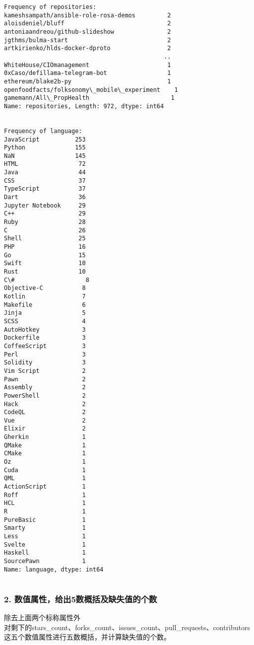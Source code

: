 \documentclass[11pt]{article}
\begin{document}
    \begin{Verbatim}[commandchars=\\\{\}]
Frequency of repositories:
kameshsampath/ansible-role-rosa-demos         2
aloisdeniel/bluff                             2
antoniaandreou/github-slideshow               2
jgthms/bulma-start                            2
artkirienko/hlds-docker-dproto                2
                                             ..
WhiteHouse/CIOmanagement                      1
0xCaso/defillama-telegram-bot                 1
ethereum/blake2b-py                           1
openfoodfacts/folksonomy\_mobile\_experiment    1
gamemann/All\_PropHealth                       1
Name: repositories, Length: 972, dtype: int64


Frequency of language:
JavaScript          253
Python              155
NaN                 145
HTML                 72
Java                 44
CSS                  37
TypeScript           37
Dart                 36
Jupyter Notebook     29
C++                  29
Ruby                 28
C                    26
Shell                25
PHP                  16
Go                   15
Swift                10
Rust                 10
C\#                    8
Objective-C           8
Kotlin                7
Makefile              6
Jinja                 5
SCSS                  4
AutoHotkey            3
Dockerfile            3
CoffeeScript          3
Perl                  3
Solidity              3
Vim Script            2
Pawn                  2
Assembly              2
PowerShell            2
Hack                  2
CodeQL                2
Vue                   2
Elixir                2
Gherkin               1
QMake                 1
CMake                 1
Oz                    1
Cuda                  1
QML                   1
ActionScript          1
Roff                  1
HCL                   1
R                     1
PureBasic             1
Smarty                1
Less                  1
Svelte                1
Haskell               1
SourcePawn            1
Name: language, dtype: int64


    \end{Verbatim}

    \subsubsection{2.
数值属性，给出5数概括及缺失值的个数}\label{ux6570ux503cux5c5eux6027ux7ed9ux51fa5ux6570ux6982ux62ecux53caux7f3aux5931ux503cux7684ux4e2aux6570}

    除去上面两个标称属性外\\
对剩下的stars\_count、forks\_count、issues\_count、pull\_requests、contributors\\
这五个数值属性进行五数概括，并计算缺失值的个数。
\end{document}
